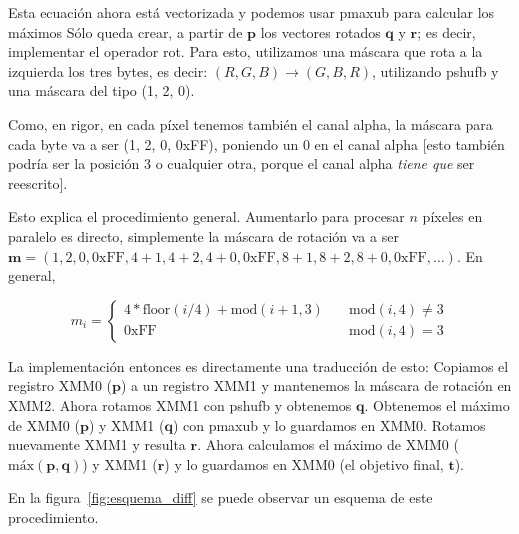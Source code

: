 Esta ecuación ahora está vectorizada y podemos usar {\ttfamily
  pmaxub} para calcular los máximos Sólo queda crear, a partir de
$\mathbf{p}$ los vectores rotados $\mathbf{q}$ y $\mathbf{r}$; es
decir, implementar el operador {\ttfamily rot}. Para esto,
utilizamos una máscara que rota a la izquierda los tres bytes, es
decir: $(R, G, B) \rightarrow (G, B, R)$, utilizando {\ttfamily
  pshufb} y una máscara del tipo (1, 2, 0).

Como, en rigor, en cada píxel tenemos también el canal alpha, la
máscara para cada byte va a ser (1, 2, 0, 0xFF), poniendo un 0 en el
canal alpha [esto también podría ser la posición 3 o cualquier otra,
porque el canal alpha \emph{tiene que} ser reescrito].


Esto explica el procedimiento general. Aumentarlo para procesar $n$
píxeles en paralelo es directo, simplemente la máscara de rotación
va a ser
$\mathbf{m} = (1, 2, 0, \text{0xFF}, 4+1, 4+2, 4+0, \text{0xFF}, 8+1, 8+2, 8+0,
\text{0xFF}, \ldots)$. En general, 

\begin{equation}
  m_i = \left\{
    \begin{array}{ll}
      4*\text{floor}(i/4) + \text{mod}(i + 1, 3) & \quad \text{mod}(i, 4) \ne 3 \\
      \text{0xFF} & \quad \text{mod}(i, 4) = 3
    \end{array}
  \right.
\end{equation}

La implementación entonces es directamente una traducción de esto:
Copiamos el registro {\ttfamily XMM0} ($\mathbf{p}$) a un registro
{\ttfamily XMM1} y mantenemos la máscara de rotación en {\ttfamily
  XMM2}. Ahora rotamos {\ttfamily XMM1} con {\ttfamily pshufb} y
obtenemos $\mathbf{q}$. Obtenemos el máximo de {\ttfamily XMM0}
($\mathbf{p}$) y {\ttfamily XMM1} ($\mathbf{q}$) con {\ttfamily
  pmaxub} y lo guardamos en {\ttfamily XMM0}. Rotamos nuevamente
{\ttfamily XMM1} y resulta $\mathbf{r}$. Ahora calculamos el máximo
de {\ttfamily XMM0} ($\text{máx}(\mathbf{p}, \mathbf{q})$) y
{\ttfamily XMM1} ($\mathbf{r}$) y lo guardamos en {\ttfamily XMM0}
(el objetivo final, $\mathbf{t}$).

En la figura~\ref{fig:esquema_diff} se puede observar un esquema de este
procedimiento.


